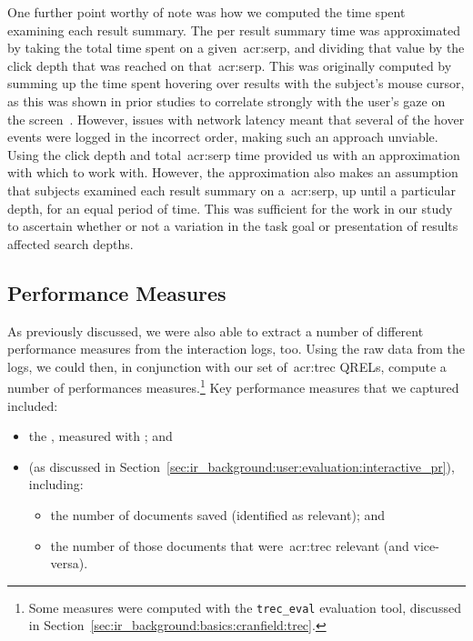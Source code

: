 One further point worthy of note was how we computed the time spent examining each result summary. The per result summary time was approximated by taking the total time spent on a given~\gls{acr:serp}, and dividing that value by the click depth that was reached on that~\gls{acr:serp}. This was originally computed by summing up the time spent hovering over results with the subject's mouse cursor, as this was shown in prior studies to correlate strongly with the user's gaze on the screen~\citep{chen2001mouse_cursor, smucker2014judging_relevance_movements}. However, issues with network latency meant that several of the hover events were logged in the incorrect order, making such an approach unviable. Using the click depth and total~\gls{acr:serp} time provided us with an approximation with which to work with. However, the approximation also makes an assumption that subjects examined each result summary on a~\gls{acr:serp}, up until a particular depth, for an equal period of time. This was sufficient for the work in our study to ascertain whether or not a variation in the task goal or presentation of results affected search depths.

\subsection{Performance Measures}
As previously discussed, we were also able to extract a number of different performance measures from the interaction logs, too. Using the raw data from the logs, we could then, in conjunction with our set of~\gls{acr:trec} QRELs, compute a number of performances measures.\footnote{Some measures were computed with the \texttt{trec\_eval} evaluation tool, discussed in Section~\ref{sec:ir_background:basics:cranfield:trec}.} Key performance measures that we captured included:

\begin{itemize}
    \item{the , measured with ; and}
    \item{ (as discussed in Section~\ref{sec:ir_background:user:evaluation:interactive_pr}), including:}
    
    \begin{itemize}
        \item{the number of documents saved (identified as relevant); and}
        \item{the number of those documents that were~\gls{acr:trec} relevant (and vice-versa).}
    \end{itemize}
\end{itemize}


